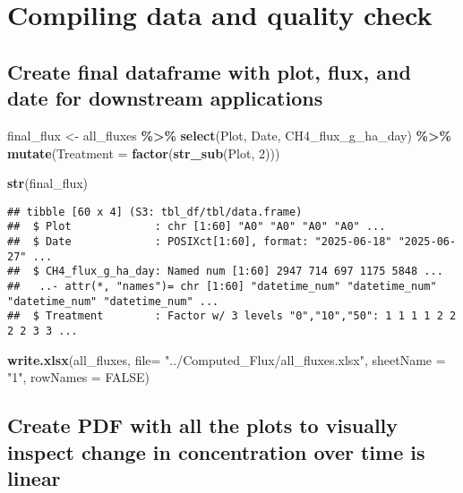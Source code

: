 \documentclass[
]{article}
\newenvironment{Shaded}{\begin{snugshade}}{\end{snugshade}}
\newcommand{\AttributeTok}[1]{\textcolor[rgb]{0.13,0.29,0.53}{#1}}
\newcommand{\ConstantTok}[1]{\textcolor[rgb]{0.56,0.35,0.01}{#1}}
\newcommand{\DecValTok}[1]{\textcolor[rgb]{0.00,0.00,0.81}{#1}}
\newcommand{\FunctionTok}[1]{\textcolor[rgb]{0.13,0.29,0.53}{\textbf{#1}}}
\newcommand{\NormalTok}[1]{#1}
\newcommand{\OtherTok}[1]{\textcolor[rgb]{0.56,0.35,0.01}{#1}}
\newcommand{\SpecialCharTok}[1]{\textcolor[rgb]{0.81,0.36,0.00}{\textbf{#1}}}
\newcommand{\StringTok}[1]{\textcolor[rgb]{0.31,0.60,0.02}{#1}}
\begin{document}
\section{Compiling data and quality
check}\label{compiling-data-and-quality-check}

\subsection{Create final dataframe with plot, flux, and date for
downstream
applications}\label{create-final-dataframe-with-plot-flux-and-date-for-downstream-applications}

\begin{Shaded}
\begin{Highlighting}[]
\NormalTok{final\_flux }\OtherTok{\textless{}{-}}\NormalTok{ all\_fluxes }\SpecialCharTok{\%\textgreater{}\%} 
  \FunctionTok{select}\NormalTok{(Plot, Date, CH4\_flux\_g\_ha\_day) }\SpecialCharTok{\%\textgreater{}\%}
  \FunctionTok{mutate}\NormalTok{(}\AttributeTok{Treatment =} \FunctionTok{factor}\NormalTok{(}\FunctionTok{str\_sub}\NormalTok{(Plot, }\DecValTok{2}\NormalTok{)))}
  
\FunctionTok{str}\NormalTok{(final\_flux)}
\end{Highlighting}
\end{Shaded}

\begin{verbatim}
## tibble [60 x 4] (S3: tbl_df/tbl/data.frame)
##  $ Plot             : chr [1:60] "A0" "A0" "A0" "A0" ...
##  $ Date             : POSIXct[1:60], format: "2025-06-18" "2025-06-27" ...
##  $ CH4_flux_g_ha_day: Named num [1:60] 2947 714 697 1175 5848 ...
##   ..- attr(*, "names")= chr [1:60] "datetime_num" "datetime_num" "datetime_num" "datetime_num" ...
##  $ Treatment        : Factor w/ 3 levels "0","10","50": 1 1 1 1 2 2 2 2 3 3 ...
\end{verbatim}

\begin{Shaded}
\begin{Highlighting}[]
\FunctionTok{write.xlsx}\NormalTok{(all\_fluxes, }\AttributeTok{file=} \StringTok{"../Computed\_Flux/all\_fluxes.xlsx"}\NormalTok{, }\AttributeTok{sheetName =} \StringTok{"1"}\NormalTok{, }\AttributeTok{rowNames =} \ConstantTok{FALSE}\NormalTok{)}
\end{Highlighting}
\end{Shaded}

\subsection{Create PDF with all the plots to visually inspect change in
concentration over time is
linear}\label{create-pdf-with-all-the-plots-to-visually-inspect-change-in-concentration-over-time-is-linear}
\end{document}
